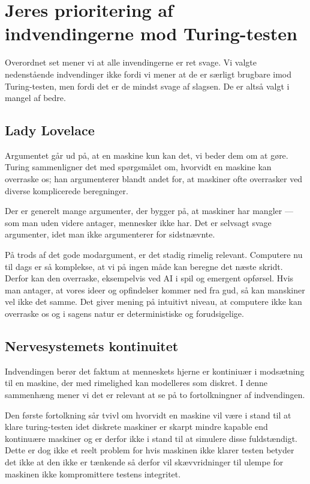 \documentclass{article}
\begin{document}
\section{Jeres prioritering af indvendingerne mod Turing-testen}
Overordnet set mener vi at alle invendingerne er ret svage. Vi valgte nedenstående indvendinger ikke fordi vi mener at de er særligt brugbare imod Turing-testen, men fordi det er de mindst svage af slagsen. De er altså valgt i mangel af bedre. %
\subsection{Lady Lovelace}
Argumentet går ud på, at en maskine kun kan det, vi beder dem om at gøre. Turing sammenligner det med spørgsmålet om, hvorvidt en maskine kan overraske os; han argumenterer blandt andet for, at maskiner ofte overrasker ved diverse komplicerede beregninger.

Der er generelt mange argumenter, der bygger på, at maskiner har mangler --- som man uden videre antager, mennesker ikke har. Det er selvsagt svage argumenter, idet man ikke argumenterer for sidstnævnte.

På trods af det gode modargument, er det stadig rimelig relevant. Computere nu til dags er så komplekse, at vi på ingen måde kan beregne det næste skridt. Derfor kan den overraske, eksempelvis ved AI i spil og emergent opførsel. Hvis man antager, at vores ideer og opfindelser kommer ned fra gud, så kan manskiner vel ikke det samme. Det giver mening på intuitivt niveau, at computere ikke kan overraske os og i sagens natur er deterministiske og forudsigelige.

\subsection{Nervesystemets kontinuitet}

Indvendingen berør det faktum at menneskets hjerne er kontiniuær i modsætning til en maskine, der med rimelighed kan modelleres som diskret. I denne sammenhæng mener vi det er relevant at se på to fortolkningner af indvendingen.

Den første fortolkning sår tvivl om hvorvidt en maskine vil være i stand til at klare turing-testen idet diskrete maskiner er skarpt mindre kapable end kontinuære maskiner og er derfor ikke i stand til at simulere disse fuldstændigt. Dette er dog ikke et reelt problem for hvis maskinen ikke klarer testen betyder det ikke at den ikke er tænkende så derfor vil skævvridninger til ulempe for maskinen ikke kompromittere testens integritet.
\end{document}
